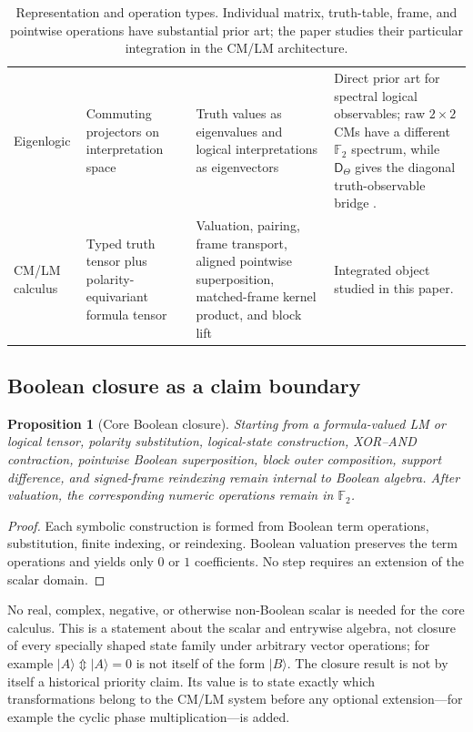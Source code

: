 \documentclass[11pt]{article}
\newtheorem{proposition}[theorem]{Proposition}
\theoremstyle{definition}
\theoremstyle{remark}
\newcommand{\F}{\mathbb F}
\newcommand{\xor}{\mathbin{\Updownarrow}}
\begin{document}
\begin{table}[ht]
\begin{tabular}{L{.15\linewidth}L{.20\linewidth}L{.22\linewidth}L{.31\linewidth}}
Eigenlogic & Commuting projectors on interpretation space & Truth values as eigenvalues and logical interpretations as eigenvectors & Direct prior art for spectral logical observables; raw $2\times2$ CMs have a different $\F_2$ spectrum, while $\mathsf D_\Theta$ gives the diagonal truth-observable bridge \cite{Toffano2015,DuboisToffano2016}.\\
CM/LM calculus & Typed truth tensor plus polarity-equivariant formula tensor & Valuation, pairing, frame transport, aligned pointwise superposition, matched-frame kernel product, and block lift & Integrated object studied in this paper.\\
\bottomrule
\end{tabular}
\caption{Representation and operation types.  Individual matrix, truth-table, frame, and pointwise operations have substantial prior art; the paper studies their particular integration in the CM/LM architecture.}
\label{tab:related}
\end{table}

\subsection{Boolean closure as a claim boundary}
\begin{proposition}[Core Boolean closure]
Starting from a formula-valued LM or logical tensor, polarity substitution, logical-state construction, XOR--AND contraction, pointwise Boolean superposition, block outer composition, support difference, and signed-frame reindexing remain internal to Boolean algebra.  After valuation, the corresponding numeric operations remain in $\F_2$.
\end{proposition}
\begin{proof}
Each symbolic construction is formed from Boolean term operations, substitution, finite indexing, or reindexing.  Boolean valuation preserves the term operations and yields only $0$ or $1$ coefficients.  No step requires an extension of the scalar domain.
\end{proof}
No real, complex, negative, or otherwise non-Boolean scalar is needed for the core calculus.  This is a statement about the scalar and entrywise algebra, not closure of every specially shaped state family under arbitrary vector operations; for example $|A\rangle\xor|A\rangle=0$ is not itself of the form $|B\rangle$.  The closure result is not by itself a historical priority claim.  Its value is to state exactly which transformations belong to the CM/LM system before any optional extension---for example the cyclic phase multiplication---is added.
\end{document}
